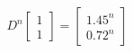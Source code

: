 \documentclass[preview]{standalone}
\begin{document}
\begin{align*}
D^n\begin{bmatrix}1\\1\end{bmatrix}=\begin{bmatrix}1.45^n\\0.72^n\end{bmatrix}
\end{align*}
\end{document}
